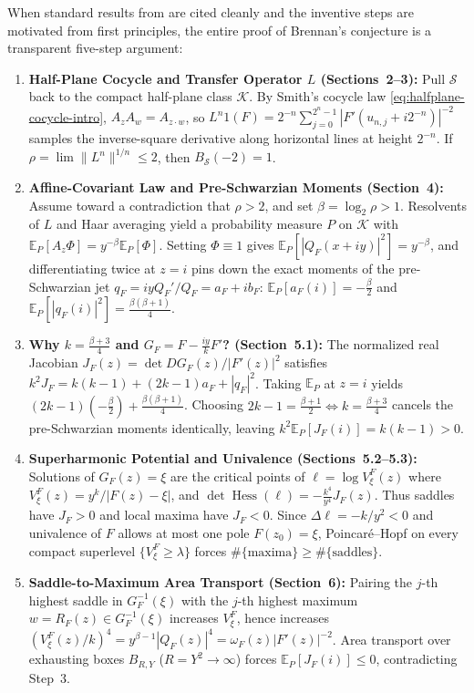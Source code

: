 \documentclass[12pt]{article}
\def\K{\mathcal{K}}
\def\S{\mathcal{S}}
\def\E{\mathbb{E}}
\theoremstyle{definition}
\numberwithin{equation}{section}
\begin{document}
When standard results from \cite{Dur83, Pom92, Zhu07} are cited cleanly and the inventive steps are motivated from first principles, the entire proof of Brennan's conjecture is a transparent five-step argument:
\begin{enumerate}
  \item \textbf{Half-Plane Cocycle and Transfer Operator $L$ (Sections~2--3):} Pull $\S$ back to the compact half-plane class $\K$. By Smith's cocycle law \eqref{eq:halfplane-cocycle-intro}, $A_z A_w = A_{z\cdot w}$, so $L^n 1(F) = 2^{-n}\sum_{j=0}^{2^n-1} |F'(u_{n,j} + i 2^{-n})|^{-2}$ samples the inverse-square derivative along horizontal lines at height $2^{-n}$. If $\rho = \lim \|L^n\|^{1/n} \le 2$, then $B_{\S}(-2) = 1$.
  \item \textbf{Affine-Covariant Law and Pre-Schwarzian Moments (Section~4):} Assume toward a contradiction that $\rho > 2$, and set $\beta = \log_2 \rho > 1$. Resolvents of $L$ and Haar averaging yield a probability measure $P$ on $\K$ with $\E_P[A_z \Phi] = y^{-\beta} \E_P[\Phi]$. Setting $\Phi \equiv 1$ gives $\E_P[|Q_F(x+iy)|^2] = y^{-\beta}$, and differentiating twice at $z=i$ pins down the exact moments of the pre-Schwarzian jet $q_F = iy Q_F'/Q_F = a_F + i b_F$: $\E_P[a_F(i)] = -\frac{\beta}{2}$ and $\E_P[|q_F(i)|^2] = \frac{\beta(\beta+1)}{4}$.
  \item \textbf{Why $k = \frac{\beta+3}{4}$ and $G_F = F - \frac{iy}{k}F'$? (Section~5.1):} The normalized real Jacobian $J_F(z) = \det DG_F(z)/|F'(z)|^2$ satisfies $k^2 J_F = k(k-1) + (2k-1)a_F + |q_F|^2$. Taking $\E_P$ at $z=i$ yields $(2k-1)(-\frac{\beta}{2}) + \frac{\beta(\beta+1)}{4}$. Choosing $2k-1 = \frac{\beta+1}{2} \iff k = \frac{\beta+3}{4}$ cancels the pre-Schwarzian moments identically, leaving $k^2 \E_P[J_F(i)] = k(k-1) > 0$.
  \item \textbf{Superharmonic Potential and Univalence (Sections~5.2--5.3):} Solutions of $G_F(z) = \xi$ are the critical points of $\ell = \log V_\xi^F(z)$ where $V_\xi^F(z) = y^k/|F(z)-\xi|$, and $\det\operatorname{Hess}(\ell) = -\frac{k^4}{y^4} J_F(z)$. Thus saddles have $J_F > 0$ and local maxima have $J_F < 0$. Since $\Delta \ell = -k/y^2 < 0$ and univalence of $F$ allows at most one pole $F(z_0)=\xi$, Poincar\'e--Hopf on every compact superlevel $\{V_\xi^F \ge \lambda\}$ forces $\#\{\text{maxima}\} \ge \#\{\text{saddles}\}$.
  \item \textbf{Saddle-to-Maximum Area Transport (Section~6):} Pairing the $j$-th highest saddle in $G_F^{-1}(\xi)$ with the $j$-th highest maximum $w = R_F(z) \in G_F^{-1}(\xi)$ increases $V_\xi^F$, hence increases $(V_\xi^F(z)/k)^4 = y^{\beta-1}|Q_F(z)|^4 = \omega_F(z)|F'(z)|^{-2}$. Area transport over exhausting boxes $B_{R,Y}$ ($R = Y^2 \to \infty$) forces $\E_P[J_F(i)] \le 0$, contradicting Step~3.
\end{enumerate}
\end{document}
